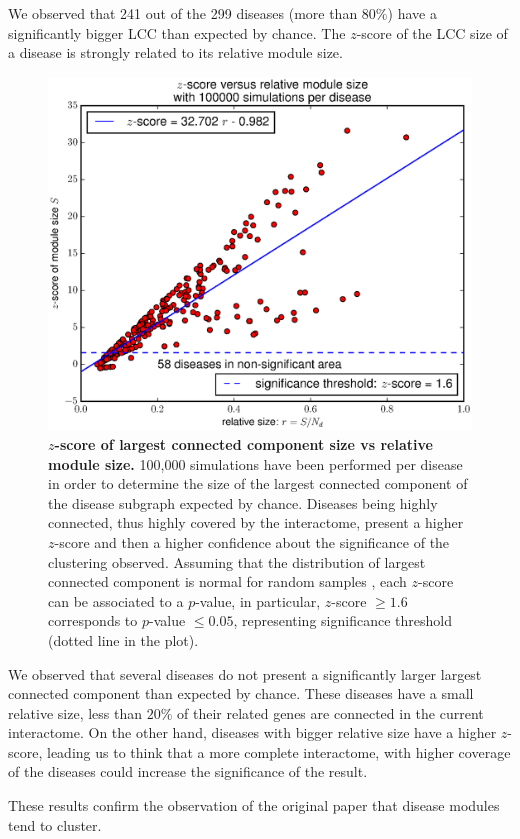 \documentclass[letterpaper]{article}
\begin{document}
		We observed that 241 out of the 299 diseases (more than $80\%$) have a significantly bigger LCC than
		expected by chance. The $z$-score of the LCC size of a disease is strongly related to its relative
		module size.

		\begin{figure}[!h]
			\hspace{-.55cm}
			\includegraphics[width=.55\textwidth]{images/S4.b100000.eps}
			\vspace{-.7cm}
			\caption{\textbf {$z$-score of largest connected component size vs relative module size.}
			100,000 simulations have been performed per disease in order to determine the size of the largest
			connected component of the disease subgraph expected by chance. Diseases being highly connected,
			thus highly covered by the interactome, present a higher $z$-score and then a higher confidence
			about the significance of the clustering observed. Assuming that the distribution of largest
			connected component is normal for random samples \citep{fluctuationGiantComponent}, each $z$-score
			can be associated to a $p$-value, in particular, $z$-score $\geq 1.6$ corresponds to $p$-value
			$\leq 0.05$, representing significance threshold (dotted line in the plot).
			\label{fig:zscore}}
		\end{figure}

		We observed that several diseases do not present a significantly larger largest connected component
		than expected by chance. These diseases have a small relative size, less than $20\%$ of their related
		genes are connected in the current interactome. On the other hand, diseases with bigger relative size
		have a higher $z$-score, leading us to think that a more complete interactome, with higher coverage
		of the diseases could increase the significance of the result.

		These results confirm the observation of the original paper that disease modules tend to cluster.
\end{document}
